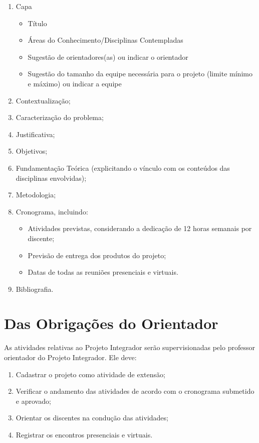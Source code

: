 \documentclass[11pt,a4paper]{report}
\begin{document}
\begin{enumerate}
    \item Capa
    \begin{itemize}
        \item Título
        \item Áreas do Conhecimento/Disciplinas Contempladas
        \item Sugestão de orientadores(as) ou indicar o orientador
        \item Sugestão do tamanho da equipe necessária para o projeto (limite mínimo e máximo) ou indicar a equipe
    \end{itemize}

    \item Contextualização;
    \item Caracterização do problema;
    \item Justificativa;
    \item Objetivos;
    \item Fundamentação Teórica (explicitando o vínculo com os conteúdos das disciplinas envolvidas);
    \item Metodologia;
    \item Cronograma, incluindo:
    \begin{itemize}
        \item Atividades previstas, considerando a dedicação de 12 horas semanais por discente;
        \item Previsão de entrega dos produtos do projeto;
        \item Datas de todas as reuniões presenciais e virtuais.
    \end{itemize}
    \item Bibliografia.
\end{enumerate}

\section{Das Obrigações do Orientador}

As atividades relativas ao Projeto Integrador serão supervisionadas pelo professor orientador do Projeto Integrador. Ele deve:

\begin{enumerate}
    \item Cadastrar o projeto como atividade de extensão;
    \item Verificar o andamento das atividades de acordo com o cronograma submetido e aprovado;
    \item Orientar os discentes na condução das atividades;
    \item Registrar os encontros presenciais e virtuais.
\end{enumerate}
\end{document}
